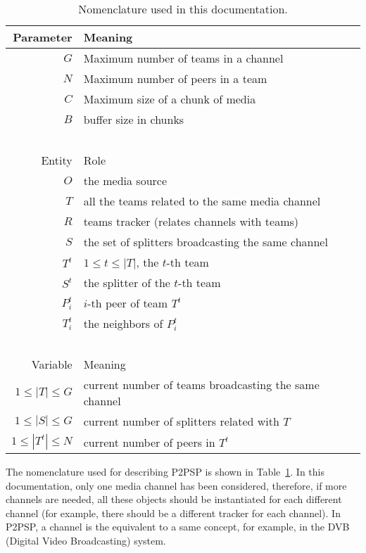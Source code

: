 \begin{table}
  \begin{tabular}{rl}
    Parameter & Meaning \\
    \hline
    $G$       & Maximum number of teams in a channel \\
    $N$       & Maximum number of peers in a team \\
    $C$       & Maximum size of a chunk of media \\
    $B$       & buffer size in chunks \\
    ~\\
    Entity  & Role \\
    \hline
    $O$     & the media source \\
    $T$     & all the teams related to the same media channel \\
    $R$     & teams tracker (relates channels with teams)\\
    $S$     & the set of splitters broadcasting the same channel \\
    $T^t$   & $1\leq t\leq |T|$, the $t$-th team \\
    $S^t$   & the splitter of the $t$-th team \\
    $P^t_i$ & $i$-th peer of team $T^t$ \\
    $T^t_i$ & the neighbors of $P^t_i$ \\
    ~\\
    Variable            & Meaning \\
    \hline
    $1\leq |T|\leq G$   & current number of teams broadcasting the same channel \\
    $1\leq |S|\leq G$   & current number of splitters related with $T$ \\
    $1\leq |T^t|\leq N$ & current number of peers in $T^t$ \\
  \end{tabular}
  \caption{Nomenclature used in this
    documentation.\label{tab:nomenclature}}
\end{table}

The nomenclature used for describing P2PSP is shown in
Table~\ref{tab:nomenclature}. In this documentation, only one media
channel has been considered, therefore, if more channels are needed,
all these objects should be instantiated for each different channel
(for example, there should be a different tracker for each
channel). In P2PSP, a channel is the equivalent to a same concept, for
example, in the DVB (Digital Video Broadcasting) system.
